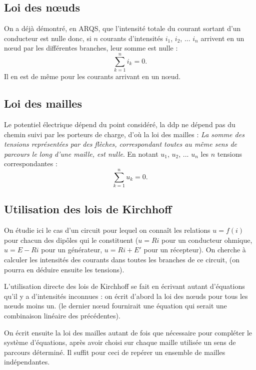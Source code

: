 \subsection{Loi des n\oe{}uds}
\label{chap9-subsec:loidesnoeuds}

On a déjà démontré, en ARQS, que l'intensité totale du courant sortant d'un conducteur est nulle donc, si $n$ courants d'intensités $i_1$, $i_2$, ... $i_n$ arrivent en un n\oe{}ud par les différentes branches, leur somme est nulle :
\begin{equation}
  \sum_{k=1}^n i_k = 0.
\end{equation}
Il en est de même pour les courants arrivant en un n\oe{}ud.

\subsection{Loi des mailles}
\label{chap9-subsec:loidesmailles}

Le potentiel électrique dépend du point considéré, la ddp ne dépend pas du chemin suivi par les porteurs de charge, d'où la loi des mailles :
\emph{La somme des tensions représentées par des flèches, correspondant toutes au même sens de parcours le long d'une maille, est nulle}. En notant $u_1$, $u_2$, ... $u_n$ les $n$ tensions correspondantes :
\begin{equation}
  \sum_{k=1}^n u_k = 0.
\end{equation}

\subsection{Utilisation des lois de Kirchhoff}
\label{chap9-subsec:utilisationdeslois}

On étudie ici le cas d'un circuit pour lequel on connaît les relations $u = f(i)$ pour chacun des dipôles qui le constituent ($u = R i$ pour un conducteur ohmique, $u = E - R i$ pour un générateur, $u = R i + E'$ pour un récepteur). On cherche à calculer les intensités des courants dans toutes les branches de ce circuit, (on pourra en déduire ensuite les tensions).

L'utilisation directe des lois de Kirchhoff se fait en écrivant autant d'équations qu'il y a d'intensités inconnues : on écrit d'abord la loi des n\oe{}uds pour tous les n\oe{}uds moins un. (le dernier n\oe{}ud fournirait une équation qui serait une combinaison linéaire des précédentes).

On écrit ensuite la loi des mailles autant de fois que nécessaire pour compléter le système d'équations, après avoir choisi sur chaque maille utilisée un sens de parcours déterminé. Il suffit pour ceci de repérer un ensemble de mailles indépendantes.

